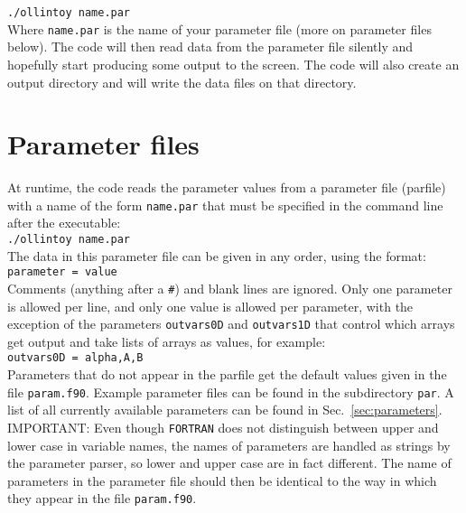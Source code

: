 \documentclass[12pt]{article}
\begin{document}
\texttt{./ollintoy name.par} \\

Where \texttt{name.par} is the name of your parameter file (more on
parameter files below).  The code will then read data from the
parameter file silently and hopefully start producing some output to
the screen. The code will also create an output directory and will
write the data files on that directory.



\section{Parameter files}
\label{sec:parfiles}

At runtime, the code reads the parameter values from a parameter file
(parfile) with a name of the form \texttt{name.par} that must be
specified in the command line after the executable: \\

\texttt{./ollintoy  name.par} \\

The data in this parameter file can be given in any order, using the
format: \\

\texttt{parameter = value} \\

Comments (anything after a \texttt{\#}) and blank lines are ignored.
Only one parameter is allowed per line, and only one value is allowed
per parameter, with the exception of the parameters \texttt{outvars0D}
and \texttt{outvars1D} that control which arrays get output and take
lists of arrays as values, for example: \\

\texttt{outvars0D = alpha,A,B} \\

Parameters that do not appear in the parfile get the default values
given in the file \texttt{param.f90}.  Example parameter files can be found
in the subdirectory \texttt{par}.  A list of all currently available parameters
can be found in Sec.~\ref{sec:parameters}. \\

IMPORTANT: Even though \texttt{FORTRAN} does not distinguish between
upper and lower case in variable names, the names of parameters are
handled as strings by the parameter parser, so lower and upper case
are in fact different.  The name of parameters in the parameter file
should then be identical to the way in which they appear in the file
\texttt{param.f90}. \\
\end{document}
